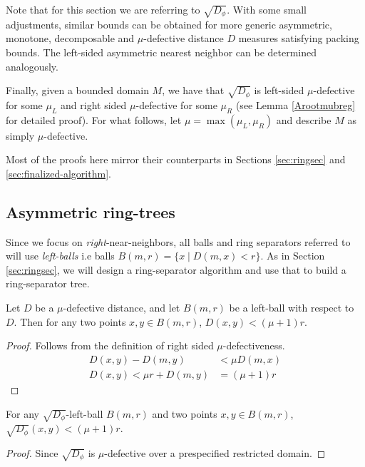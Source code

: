 \documentclass[11pt]{myclass}
\newcommand{\breg}{\ensuremath{D_\phi}}
\begin{document}
 Note that for this section  we are referring to $\sqrt{\breg}$.
 With some small adjustments, similar bounds can be obtained for
more generic asymmetric, monotone, decomposable and $\mu$-defective distance $D$ measures satisfying packing bounds.
The left-sided asymmetric nearest neighbor can be determined analogously.

Finally, given a bounded domain $M$, we have that $\sqrt{\breg}$  is left-sided $\mu$-defective 
for some $\mu_L$ and right sided $\mu$-defective for some $\mu_R$ (see Lemma \ref{Arootmubreg} for detailed proof). 
For what follows, let $\mu = \max(\mu_L, \mu_R)$  and describe $M$ as simply $\mu$-defective. 


Most of the proofs here mirror their counterparts in Sections \ref{sec:ringsec} and \ref{sec:finalized-algorithm}. 

\subsection{Asymmetric ring-trees}
\label{subsec:ringextension} 
Since we focus on \emph{right}-near-neighbors, all balls and ring separators referred to will use \emph{left-balls}
 i.e balls $B(m,r) = \{x \mid  D(m,x) < r\}$. As in Section \ref{sec:ringsec}, we will design a ring-separator algorithm and 
use that to build a ring-separator tree.


\begin{lemma} \label{leftcircle}
Let $D$ be a $\mu$-defective distance, and let $B(m,r)$ be a left-ball with respect to $D$. Then for any two points $x,y \in B(m,r)$, $D(x,y) < (\mu+1) r$.
\end{lemma}

 \begin{proof}
 Follows from the definition of right sided $\mu$-defectiveness.
  \begin{align*}
  D(x,y) - D(m,y) &< \mu  D(m,x) 
  \\ D(x,y) <  \mu r +  D(m,y)  &= (\mu + 1) r
  \end{align*}
 \end{proof}
 
 \begin{corollary}
 For any $\sqrt{\breg}$-left-ball $B(m,r)$ and two points $x,y \in B(m,r)$,
 $\sqrt{\breg}(x,y) < (\mu+1) r$. 
 \end{corollary}
\begin{proof}
Since $\sqrt{\breg}$ is $\mu$-defective over a prespecified restricted domain.
\end{proof}
\end{document}

